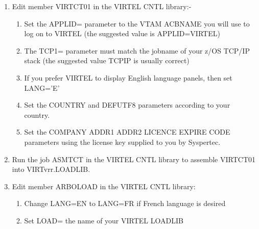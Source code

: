 \documentclass[letterpaper,10pt,english]{sphinxmanual}
\begin{document}
\begin{sphinxVerbatim}[commandchars=\\\{\}]
 
\end{sphinxVerbatim}
\begin{enumerate}
\def\theenumi{\arabic{enumi}}
\def\labelenumi{\theenumi .}
\makeatletter\def\p@enumii{\p@enumi \theenumi .}\makeatother
\setcounter{enumi}{6}
\item {} 
Edit member VIRTCT01 in the VIRTEL CNTL library:-
\begin{enumerate}
\def\theenumii{\alph{enumii}}
\def\labelenumii{\theenumii )}
\makeatletter\def\p@enumiii{\p@enumii \theenumii )}\makeatother
\item {} 
Set the APPLID= parameter to the VTAM ACBNAME you will use to log on to VIRTEL (the suggested value is APPLID=VIRTEL)

\item {} 
The TCP1= parameter must match the jobname of your z/OS TCP/IP stack (the suggested value TCPIP is usually correct)

\item {} 
If you prefer VIRTEL to display English language panels, then set LANG=’E’

\item {} 
Set the COUNTRY and DEFUTF8 parameters according to your country.

\item {} 
Set the COMPANY ADDR1 ADDR2 LICENCE EXPIRE CODE parameters using the license key supplied to you by Syspertec.

\end{enumerate}

\item {} 
Run the job ASMTCT in the VIRTEL CNTL library to assemble VIRTCT01 into VIRTvrr.LOADLIB.

\item {} 
Edit member ARBOLOAD in the VIRTEL CNTL library:
\begin{enumerate}
\def\theenumii{\alph{enumii}}
\def\labelenumii{\theenumii )}
\makeatletter\def\p@enumiii{\p@enumii \theenumii )}\makeatother
\item {} 
Change LANG=EN to LANG=FR if French language is desired

\item {} 
Set LOAD= the name of your VIRTEL LOADLIB


\end{enumerate}
\end{enumerate}
\end{document}
